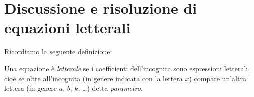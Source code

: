 \vspazio\ovalbox{\risolvii \ref{ese:3.39}, \ref{ese:3.40}, \ref{ese:3.41}, \ref{ese:3.42}, \ref{ese:3.43}, \ref{ese:3.44}, \ref{ese:3.45}, \ref{ese:3.46}, \ref{ese:3.47}, \ref{ese:3.48}, \ref{ese:3.49}, \ref{ese:3.50}, \ref{ese:3.51},}

\vspazio\ovalbox{\ref{ese:3.52}, \ref{ese:3.53}}

\section{Discussione e risoluzione di equazioni letterali}
Ricordiamo la seguente definizione:
\begin{definizione}
Una equazione è \emph{letterale} se i coefficienti dell'incognita sono espressioni letterali, cioè se oltre all'incognita (in genere indicata con
la lettera $x$) compare un'altra lettera (in genere $a$, $b$, $k$, \ldots) detta \emph{parametro}.
\end{definizione}

